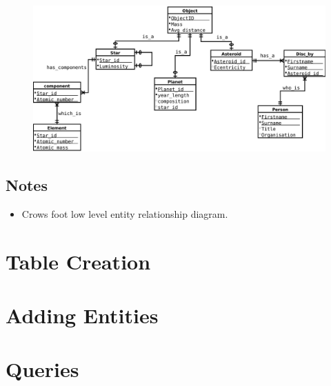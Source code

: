 \documentclass[11pt]{article} %
\begin{document}
\begin{figure}[h]
	\centering
	\includegraphics[width=1.0\textwidth]{ERD-low-CF.pdf}
\end{figure}

\subsection{Notes}
\label{sub:notes}
\begin{itemize}
	\item Crows foot low level entity relationship diagram.
\end{itemize}



\newpage
\section{Table Creation}
\label{sec:table_creation}




\section{Adding Entities}
\label{sec:adding_entities}




\section{Queries}
\label{sec:queries}



\end{document}
